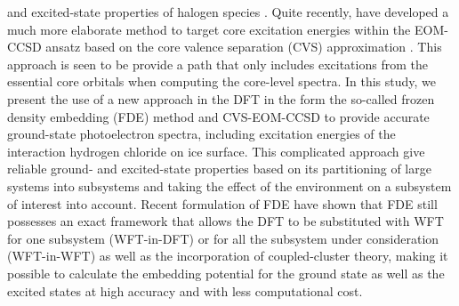 \documentclass[a4paper,11pt]{report}
\begin{document}
and excited-state properties of halogen species \citep{shee2018equation,bouchafra2018predictive}. 
Quite recently, \citep{peng2015energy} have developed a much more elaborate method to target core
excitation energies within the EOM-CCSD ansatz based on the core valence separation (CVS) approximation \citep{cederbaum1980many}. This approach is seen to be
provide a path that only includes excitations from the essential core orbitals when computing the core-level spectra. 
In this study, we present the use of a new approach in the DFT in the form the so-called frozen density embedding (FDE) method and  CVS-EOM-CCSD 
to provide accurate ground-state photoelectron spectra, including excitation energies of the interaction hydrogen chloride on ice surface. This complicated approach give reliable ground- and excited-state properties based on its partitioning of large systems into subsystems and
taking the effect of the environment on a subsystem of interest into account. Recent formulation of FDE have shown that FDE still possesses an exact framework that allows the DFT to be substituted with WFT for one subsystem (WFT-in-DFT) \citep{gomes2008calculation,hofener2013solvatochromic} or for all the
subsystem under consideration (WFT-in-WFT) \citep{hofener2012calculation} as well as the incorporation of coupled-cluster theory, making it possible to calculate the embedding potential for the ground state as well as the excited states at high accuracy and with less computational cost. 
\end{document}
